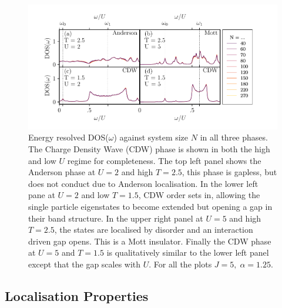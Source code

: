 \hypertarget{fig:DOS}{%
\begin{figure}
\centering
\includegraphics[width=1\textwidth,height=\textheight]{figure_code/fk_chapter/DOS/DOS}
\caption[{Energy resolved DOS(\(\omega\)) in the difference phases.}]{Energy resolved DOS(\(\omega\)) against system size \(N\) in all three phases. The Charge Density Wave (CDW) phase is shown in both the high and low \(U\) regime for completeness. The top left panel shows the Anderson phase at \(U = 2\) and high \(T = 2.5\), this phase is gapless, but does not conduct due to Anderson localisation. In the lower left pane at \(U = 2\) and low \(T = 1.5\), CDW order sets in, allowing the single particle eigenstates to become extended but opening a gap in their band structure. In the upper right panel at \(U = 5\) and high \(T = 2.5\), the states are localised by disorder and an interaction driven gap opens. This is a Mott insulator. Finally the CDW phase at \(U = 5\) and \(T = 1.5\) is qualitatively similar to the lower left panel except that the gap scales with \(U\). For all the plots \(J = 5,\;\alpha = 1.25\).}
\label{fig:DOS}
\end{figure}
}

\hypertarget{localisation-properties}{%
\subsection{Localisation Properties}\label{localisation-properties}}

